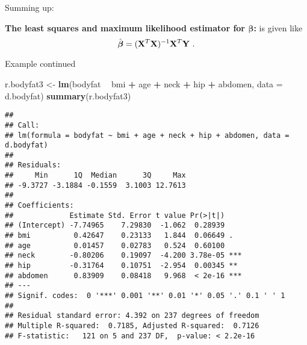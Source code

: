 \documentclass[10pt,ignorenonframetext,]{beamer}
\newenvironment{Shaded}{\begin{snugshade}}{\end{snugshade}}
\newcommand{\DataTypeTok}[1]{\textcolor[rgb]{0.13,0.29,0.53}{#1}}
\newcommand{\KeywordTok}[1]{\textcolor[rgb]{0.13,0.29,0.53}{\textbf{#1}}}
\newcommand{\NormalTok}[1]{#1}
\newcommand{\OperatorTok}[1]{\textcolor[rgb]{0.81,0.36,0.00}{\textbf{#1}}}
\newcommand{\StringTok}[1]{\textcolor[rgb]{0.31,0.60,0.02}{#1}}
\begin{document}
\begin{frame}

Summing up:

\textbf{The least squares and maximum likelihood estimator for ${\boldsymbol \beta}$:}
is given like
\[ \hat{\boldsymbol\beta}=({\bf X}^T{\bf X})^{-1} {\bf X}^T {\bf Y} \ .\]

\end{frame}

\begin{frame}[fragile]

\begin{block}{Example continued}

\vspace{5mm}

\tiny

\begin{Shaded}
\begin{Highlighting}[]
\NormalTok{r.bodyfat3 <-}\StringTok{ }\KeywordTok{lm}\NormalTok{(bodyfat }\OperatorTok{~}\StringTok{ }\NormalTok{bmi }\OperatorTok{+}\StringTok{ }\NormalTok{age }\OperatorTok{+}\StringTok{ }\NormalTok{neck }\OperatorTok{+}\StringTok{ }\NormalTok{hip }\OperatorTok{+}\StringTok{ }\NormalTok{abdomen, }\DataTypeTok{data =}\NormalTok{ d.bodyfat)}
\KeywordTok{summary}\NormalTok{(r.bodyfat3)}
\end{Highlighting}
\end{Shaded}

\begin{verbatim}
## 
## Call:
## lm(formula = bodyfat ~ bmi + age + neck + hip + abdomen, data = d.bodyfat)
## 
## Residuals:
##     Min      1Q  Median      3Q     Max 
## -9.3727 -3.1884 -0.1559  3.1003 12.7613 
## 
## Coefficients:
##             Estimate Std. Error t value Pr(>|t|)    
## (Intercept) -7.74965    7.29830  -1.062  0.28939    
## bmi          0.42647    0.23133   1.844  0.06649 .  
## age          0.01457    0.02783   0.524  0.60100    
## neck        -0.80206    0.19097  -4.200 3.78e-05 ***
## hip         -0.31764    0.10751  -2.954  0.00345 ** 
## abdomen      0.83909    0.08418   9.968  < 2e-16 ***
## ---
## Signif. codes:  0 '***' 0.001 '**' 0.01 '*' 0.05 '.' 0.1 ' ' 1
## 
## Residual standard error: 4.392 on 237 degrees of freedom
## Multiple R-squared:  0.7185, Adjusted R-squared:  0.7126 
## F-statistic:   121 on 5 and 237 DF,  p-value: < 2.2e-16
\end{verbatim}

\normalsize

\end{block}

\end{frame}
\end{document}
